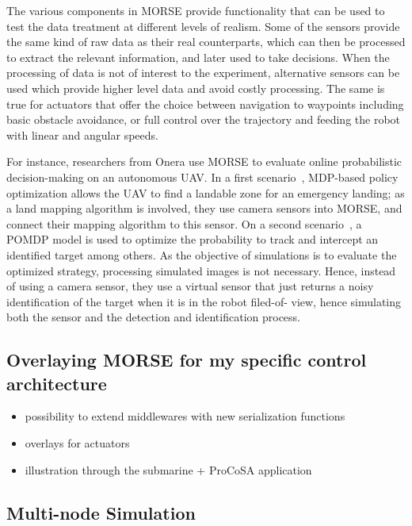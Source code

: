 \documentclass{llncs}
\begin{document}
The various components in MORSE provide functionality that can be used to test
the data treatment at different levels of realism. Some of the sensors provide
the same kind of raw data as their real counterparts, which can then be
processed to extract the relevant information, and later used to take
decisions. When the processing of data is not of interest to the experiment,
alternative sensors can be used which provide higher level data and avoid
costly processing. The same is true for actuators that offer the choice
between navigation to waypoints including basic obstacle avoidance, or full
control over the trajectory and feeding the robot with linear and angular
speeds.


%
%
For instance, researchers from Onera use MORSE to evaluate online probabilistic
decision-making on an autonomous UAV. In a first scenario~\cite{teichteil2011},
MDP-based policy optimization allows the UAV to find a landable zone for an emergency landing;
as a land mapping algorithm is involved, they use camera sensors into MORSE, and connect
their mapping algorithm to this sensor. On a second scenario~\cite{carvalho2012},
a POMDP model is used to optimize the probability to track and intercept an identified target
among others. As the objective of simulations is to evaluate the optimized strategy,
processing simulated images is not necessary. Hence, instead of using a camera sensor, they use
a virtual sensor that just returns a noisy identification of the target when it is in the robot filed-of-
view, hence simulating both the sensor and the detection and identification process.

\subsection{Overlaying MORSE for my specific control architecture}

\begin{itemize}
\item possibility to extend middlewares with new serialization functions
\item overlays for actuators
\item illustration through the submarine + ProCoSA application
\end{itemize}

\subsection{Multi-node Simulation}
\label{section:multinode}
\end{document}
